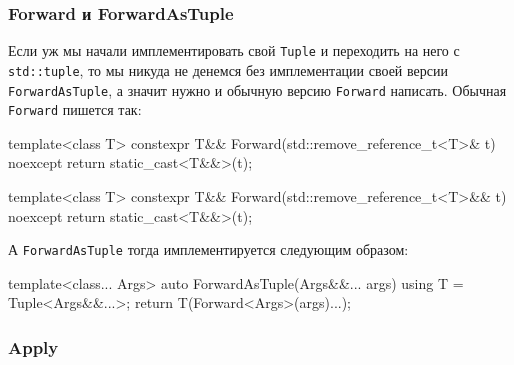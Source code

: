 \subsubsection{Forward и ForwardAsTuple}

Если уж мы начали имплементировать свой \verb"Tuple" и переходить на него с \verb"std::tuple", то мы никуда не денемся без имплементации своей версии \verb"ForwardAsTuple", а значит нужно и обычную версию \verb"Forward" написать.
Обычная \verb"Forward" пишется так:
\begin{cppcode}
template<class T>
constexpr T&& Forward(std::remove_reference_t<T>& t) noexcept {
  return static_cast<T&&>(t);
}

template<class T>
constexpr T&& Forward(std::remove_reference_t<T>&& t) noexcept {
  return static_cast<T&&>(t);
}
\end{cppcode}
А \verb"ForwardAsTuple" тогда имплементируется следующим образом:
\begin{cppcode}
template<class... Args>
auto ForwardAsTuple(Args&&... args) {
  using T = Tuple<Args&&...>;
  return T(Forward<Args>(args)...);
}
\end{cppcode}

\subsubsection{Apply}

